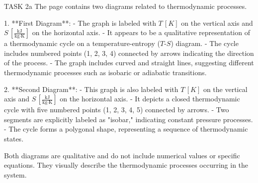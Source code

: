 TASK 2a  
The page contains two diagrams related to thermodynamic processes.

1. **First Diagram**:  
   - The graph is labeled with \( T \, [K] \) on the vertical axis and \( S \, [\frac{\text{kJ}}{\text{kg·K}}] \) on the horizontal axis.  
   - It appears to be a qualitative representation of a thermodynamic cycle on a temperature-entropy (\( T \)-\( S \)) diagram.  
   - The cycle includes numbered points (1, 2, 3, 4) connected by arrows indicating the direction of the process.  
   - The graph includes curved and straight lines, suggesting different thermodynamic processes such as isobaric or adiabatic transitions.  

2. **Second Diagram**:  
   - This graph is also labeled with \( T \, [K] \) on the vertical axis and \( S \, [\frac{\text{kJ}}{\text{kg·K}}] \) on the horizontal axis.  
   - It depicts a closed thermodynamic cycle with five numbered points (1, 2, 3, 4, 5) connected by arrows.  
   - Two segments are explicitly labeled as "isobar," indicating constant pressure processes.  
   - The cycle forms a polygonal shape, representing a sequence of thermodynamic states.  

Both diagrams are qualitative and do not include numerical values or specific equations. They visually describe the thermodynamic processes occurring in the system.